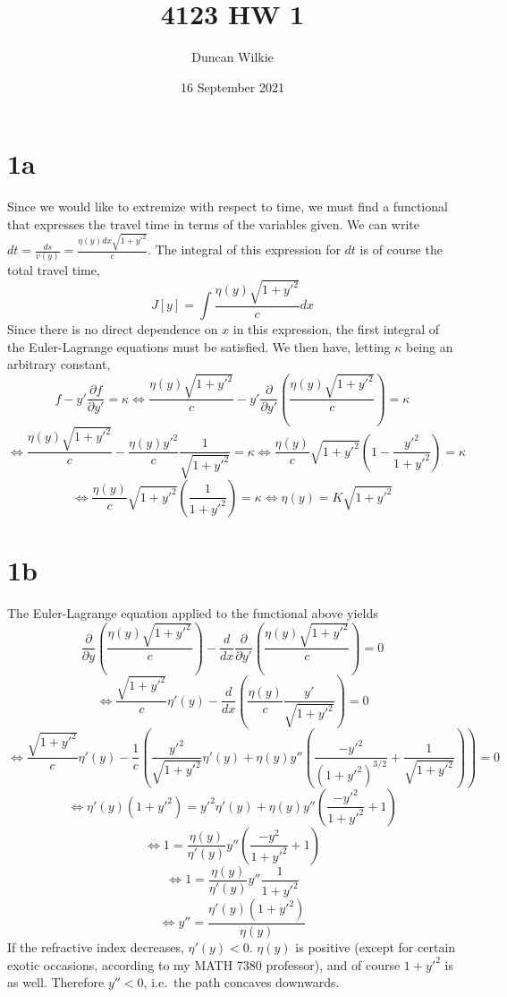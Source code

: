 \documentclass{article}
\title{4123 HW 1}
\author{Duncan Wilkie}
\date{16 September 2021}
\begin{document}
\maketitle

\section*{1a}
Since we would like to extremize with respect to time, we must find a functional that expresses the travel time in terms of the variables given.
We can write $dt = \frac{ds}{v(y)}=\frac{\eta(y)dx\sqrt{1+y'^2}}{c}$.
The integral of this expression for $dt$ is of course the total travel time,\[J[y]  = \int\frac{\eta(y)\sqrt{1+y'^2}}{c}dx\]
Since there is no direct dependence on $x$ in this expression, the first integral of the Euler-Lagrange equations must be satisfied.
We then have, letting $\kappa$ being an arbitrary constant,
\[f-y'\frac{\partial f}{\partial y'} = \kappa\Leftrightarrow \frac{\eta(y)\sqrt{1+y'^2}}{c}-y'\frac{\partial}{\partial y'}\left(\frac{\eta(y)\sqrt{1+y'^2}}{c}\right) = \kappa\]
\[\Leftrightarrow \frac{\eta(y)\sqrt{1+y'^2}}{c}-\frac{\eta(y)y'^2}{c}\frac{1}{\sqrt{1+y'^2}}=\kappa\Leftrightarrow\frac{\eta(y)}{c}\sqrt{1+y'^2}\left(1-\frac{y'^2}{1+y'^2}\right)=\kappa\]
\[\Leftrightarrow\frac{\eta(y)}{c}\sqrt{1+y'^2}\left(\frac{1}{1+y'^2}\right)=\kappa \Leftrightarrow\eta(y)=K{\sqrt{1+y'^2}}\]

\section*{1b}
The Euler-Lagrange equation applied to the functional above yields
\[\frac{\partial}{\partial y}\left(\frac{\eta(y)\sqrt{1+y'^2}}{c}\right)-\frac{d}{dx}\frac{\partial}{\partial y'}\left(\frac{\eta(y)\sqrt{1+y'^2}}{c}\right) = 0\]
\[\Leftrightarrow\frac{\sqrt{1+y'^2}}{c}\eta'(y)-\frac{d}{dx}\left(\frac{\eta(y)}{c}\frac{y'}{\sqrt{1+y'^2}}\right)=0\]
\[\Leftrightarrow\frac{\sqrt{1+y'^2}}{c}\eta'(y)-\frac{1}{c}\left(\frac{y'^2}{\sqrt{1+y'^2}}\eta'(y)+\eta(y)y''\left(\frac{-y'^2}{{(1+y'^2)}^{3/2}}+\frac{1}{\sqrt{1+y'^2}}\right)\right)=0\]
\[\Leftrightarrow \eta'(y)(1+y'^2)=y'^2\eta'(y)+\eta(y)y''\left(\frac{-y'^2}{1+y'^2}+1\right)\]
\[\Leftrightarrow 1=\frac{\eta(y)}{\eta'(y)}y''\left(\frac{-y^2}{1+y'^2}+1\right)\]
\[\Leftrightarrow 1 = \frac{\eta(y)}{\eta'(y)}y''\frac{1}{1+y'^2}\]
\[\Leftrightarrow y''=\frac{\eta'(y)(1+y'^2)}{\eta(y)}\]
If the refractive index decreases, $\eta'(y) < 0$. $\eta(y)$ is positive (except for certain exotic occasions, according to my MATH 7380 professor), and of course $1+y'^2$ is as well. Therefore $y'' < 0$, i.e.\ the path concaves downwards.
\end{document}
